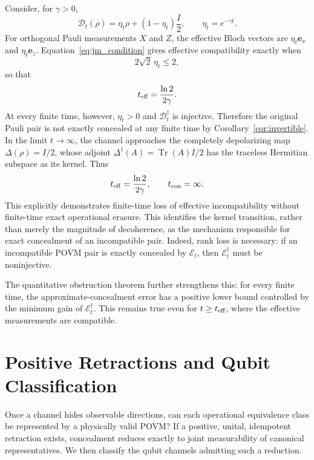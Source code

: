 \documentclass[
aps,pra,twocolumn,10pt,
superscriptaddress,longbibliography,floatfix
]{revtex4-2}
\DeclareMathOperator{\Tr}{Tr}
\begin{document}
Consider, for $\gamma > 0$,
\begin{equation}
\mathcal D_t(\rho)=\eta_t\rho+(1-\eta_t)\frac{I}{2},
\qquad \eta_t=e^{-\gamma t}.
\label{eq:depolarizing_semigroup}
\end{equation}
For orthogonal Pauli measurements $X$ and $Z$, the effective Bloch vectors are $\eta_t\mathbf e_x$ and $\eta_t\mathbf e_z$. Equation~\eqref{eq:jm_condition} gives effective compatibility exactly when
\[
2\sqrt2\,\eta_t\le2,
\]
so that
\begin{equation}
t_{\rm eff}=\frac{\ln 2}{2\gamma}.
\label{eq:effective_time}
\end{equation}
At every finite time, however, $\eta_t>0$ and $\mathcal D_t^\dagger$ is injective. Therefore the original Pauli pair is not exactly concealed at any finite time by Corollary~\ref{cor:invertible}. In the limit $t\to\infty$, the channel approaches the completely depolarizing map $\Delta(\rho)=I/2$, whose adjoint $\Delta^\dagger(A)=\Tr(A)I/2$ has the traceless Hermitian subspace as its kernel. Thus
\begin{equation}
t_{\rm eff}=\frac{\ln 2}{2\gamma},
\qquad t_{\rm con}=\infty.
\label{eq:time_separation}
\end{equation}
This explicitly demonstrates finite-time loss of effective incompatibility without finite-time exact operational erasure. This identifies the kernel transition, rather than merely the magnitude of decoherence, as the mechanism responsible for exact concealment of an incompatible pair. Indeed, rank loss is necessary: if an incompatible POVM pair is exactly concealed by $\mathcal E_t$, then $\mathcal E_t^\dagger$ must be noninjective.

The quantitative obstruction theorem further strengthens this: for every finite time, the approximate-concealment error has a positive lower bound controlled by the minimum gain of $\mathcal E_t^\dagger$. This remains true even for $t\ge t_{\rm eff}$, where the effective measurements are compatible.

\section{Positive Retractions and Qubit Classification}
\label{sec:retractions}

Once a channel hides observable directions, can each operational equivalence class be represented by a physically valid POVM? If a positive, unital, idempotent retraction exists, concealment reduces exactly to joint measurability of canonical representatives. We then classify the qubit channels admitting such a reduction.
\end{document}
